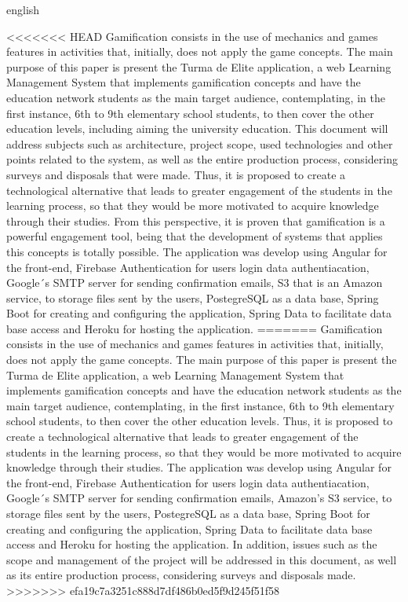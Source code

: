 \begin{resumo}[Abstract]
 \begin{otherlanguage*}{english}
 
    \vspace{\onelineskip}
 
<<<<<<< HEAD
     Gamification consists in the use of mechanics and games features in activities that, initially, does not apply the game concepts. The main purpose of this paper is present the Turma de Elite application, a web Learning Management System that implements gamification concepts and have the education network students as the main target audience, contemplating, in the first instance, 6th to 9th elementary school students, to then cover the other education levels, including aiming the university education.
     This document will address subjects such as architecture, project scope, used technologies and other points related to the system, as well as the entire production process, considering surveys and disposals that were made.
     Thus, it is proposed to create a technological alternative that leads to greater engagement of the students in the learning process, so that they would be more motivated to acquire knowledge through their studies. From this perspective, it is proven that gamification is a powerful engagement tool, being that the development of systems that applies this concepts is totally possible. The application was develop using Angular for the front-end, Firebase Authentication for users login data authentiacation, Google´s SMTP server for sending confirmation emails, S3 that is an Amazon service, to storage files sent by the users, PostegreSQL as a data base, Spring Boot for creating and configuring the application, Spring Data to facilitate data base access and Heroku for hosting the application. 
=======
     Gamification consists in the use of mechanics and games features in activities that, initially, does not apply the game concepts. The main purpose of this paper is present the Turma de Elite application, a web Learning Management System that implements gamification concepts and have the education network students as the main target audience, contemplating, in the first instance, 6th to 9th elementary school students, to then cover the other education levels.
     Thus, it is proposed to create a technological alternative that leads to greater engagement of the students in the learning process, so that they would be more motivated to acquire knowledge through their studies. The application was develop using Angular for the front-end, Firebase Authentication for users login data authentiacation, Google´s SMTP server for sending confirmation emails, Amazon's S3 service, to storage files sent by the users, PostegreSQL as a data base, Spring Boot for creating and configuring the application, Spring Data to facilitate data base access and Heroku for hosting the application. In addition, issues such as the scope and management of the project will be addressed in this document, as well as its entire production process, considering surveys and disposals made.
>>>>>>> efa19c7a3251c888d7df486b0ed5f9d245f51f58
     

\end{otherlanguage*}
\end{resumo}
